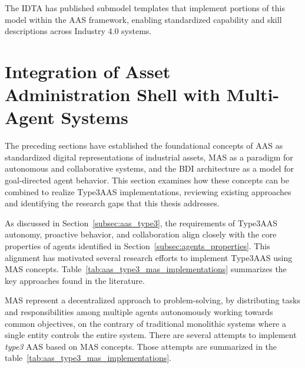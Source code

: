 The IDTA has published submodel templates that implement portions of this model within the \ac{AAS} framework, enabling standardized capability and skill descriptions across Industry 4.0 systems.

\newpage
\section{Integration of Asset Administration Shell with Multi-Agent Systems}

\label{sec:aas_mas_integration}

The preceding sections have established the foundational concepts of \ac{AAS} as standardized digital representations of industrial assets, \ac{MAS} as a paradigm for autonomous and collaborative systems, and the \ac{BDI} architecture as a model for goal-directed agent behavior. This section examines how these concepts can be combined to realize \ac{Type3AAS} implementations, reviewing existing approaches and identifying the research gaps that this thesis addresses.

As discussed in Section~\ref{subsec:aas_type3}, the requirements of \ac{Type3AAS} autonomy, proactive behavior, and collaboration align closely with the core properties of agents identified in Section~\ref{subsec:agents_properties}. This alignment has motivated several research efforts to implement \ac{Type3AAS} using \ac{MAS} concepts. Table~\ref{tab:aas_type3_mas_implementations} summarizes the key approaches found in the literature.




\ac{MAS} represent a decentralized approach to problem-solving,
by distributing tasks and responsibilities among multiple agents autonomously working towards common objectives,
on the contrary of traditional monolithic systems where a single entity controls the entire system\cite{leitao2016smart}.
There are several attempts to implement \textit{type3} \ac{AAS} based on \ac{MAS} concepts.
Those attempts are summarized in the table~\ref{tab:aas_type3_mas_implementations}.

